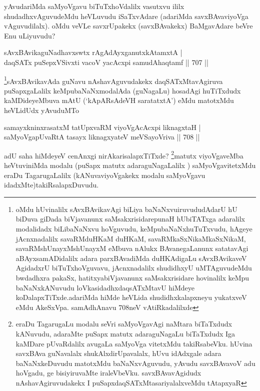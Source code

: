 \begin{artha}
yAvudariMda saMyoVgavu biTuTxhoVdalilx vasutxvu ililx shudadhxvAguvudeMdu heVLuvudu iSaTxvAdare (adariMda savxBAvaviyoVga vAguvudilalx). oMdu veVLe savxrUpakekx (savxBAvakekx) BaMgavAdare beVre Enu uLiyuvudu?
\end{artha}


\begin{shl}
sAvxBAvikaguNadhavxswtx rAgAdAyxganutxkAtamxtA | \\
daqSATx puSepxVSivxti vacoV yacAcxpi samudAhaqtamf \hfill||  707 ||  
\end{shl}

\begin{artha}
\footnote{oMdu hUvinalilx sAvxBAvikavAgi biLiya baNaNxvuiruvududAdarU hU biDuva giDada biVjavanunx saMsakxrisidarepunaH hUbiTATxga adaralilx modalidadx biLibaNaNxvu hoVguvudu, keMpubaNaNxhuTuTxvudu, hAgeye jAcnxnadalilx savaRMduHKaM duHKaM, savaRMkaSxNikaMkaSxNikaM, savaRMshUnayxMshUnayxM eMbuva nAlukx BAvanegaLanunx satatavAgi aBAyxsamADidalilx adara parxBAvadiMda duHKAdigaLu sAvxBAvikaveV AgidadxrU biTuTxhoVguvavu, jAcnxnadalilx shudidhxyU uMTAguvudeMdu bwdadhxra pakaSx, hatitxyabiVjavanunx saMsakxrisidare hovinalilx keMpu baNaNxkANuvudu loVkasidadhxdaqsATxMtavU hiMdeye koDalapxTiTxde.adariMda hiMde heVLida shudidhxkalapxneyu yukatxveV eMdu AkeSxVpa. samAdhAnavu 708neV vAtiRkadalilxde}sAvxBAvikavAda guNavu nAshavAguvudakekx daqSATxMtavAgiruva puSapxgaLalilx keMpubaNaNxmodalAda (guNagaLu) hosadAgi huTiTxdudx kaMDideyeMbuva mAtU (`kApARsAdeVH saratatxtA') eMdu matotxMdu heVLidUdx yAvuduMTo
\end{artha}

\begin{shl}
samayxkninxrasatxM tatUpxvaRM viyoVgAcAcxpi liknagxtaH | \\
saMyoVgapUvaRtA tasayx liknagxyateV meVSayoVriva \hfill||  708 ||  
\end{shl}

\begin{artha}
adU saha hiMdeyeV cenAnxgi nirAkarisalapxTiTxde? \footnote{eraDu TagarugaLu modalu seVri saMyoVgavAgi naMtara biTaTxdudx kANuvudu, adaraMte puSapx matutx adaraguNagaLu biTaTxdudx Iga kaMDare pUvaRdalilx avugaLa saMyoVga vitetxMdu takiRsabeVku. hUvina savxBAva guNavalalx shukAlxdirUpavalalx, hUvu idAdxgale adara baNaNxkeDuvudu matotxMdu baNaNxvAguvudu, yAvudu savxBAvavoV adu hoVgadu, ge bisiyiruvaMte iraleVbeVku. savxBAvavAgidudx nAshavAgiruvudakekx I puSapxdaqSATxMtasariyalalxveMdu tAtapxyaR}matutx viyoVgaveMba heVtuviniMda modalu (puSapx matutx adaraguNagaLalilx ) saMyoVgavitetxMdu eraDu TagarugaLalilx (kANuvaviyoVgakekx modalu saMyoVgavu idadxMte)takiRsalapxDuvudu.
\end{artha}

